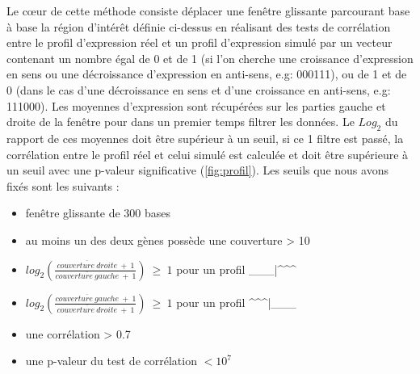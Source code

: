 \documentclass[12pt,a4paper]{report}
\begin{document}
\begin{onehalfspace}
Le cœur de cette méthode consiste déplacer une fenêtre glissante parcourant base à base la région d'intérêt définie ci-dessus en réalisant des tests de corrélation entre le profil d'expression réel et un profil d'expression simulé par un vecteur contenant un nombre égal de 0 et de 1 (si l'on cherche une croissance d'expression en sens ou une décroissance d'expression en anti-sens, e.g: 000111), ou de 1 et de 0 (dans le cas d'une décroissance en sens et d'une croissance en anti-sens, e.g: 111000). Les moyennes d'expression sont récupérées sur les parties gauche et droite de la fenêtre pour dans un premier temps filtrer les données. Le $Log_2$ du rapport de ces moyennes doit être supérieur à un seuil, si ce 1 filtre est passé, la corrélation entre le profil réel et celui simulé est calculée et doit être supérieure à un seuil avec une p-valeur significative (\autoref{fig:profil}). Les seuils que nous avons fixés sont les suivants : 
\begin{itemize}[label=$\bullet$]
\item fenêtre glissante de 300 bases
\item au moins un des deux gènes possède une couverture > 10
\item $log_2(\frac{\overline{couverture~droite}~+~1}{\overline{couverture~gauche}~+~1})~\geq~1$ pour un profil \_\_\_|\^{ }\^{ }\^{ }
\item $log_2(\frac{\overline{couverture~gauche}~+~1}{\overline{couverture~droite}~+~1})~\geq~1$ pour un profil \^{ }\^{ }\^{ }|\_\_\_
\item une corrélation > 0.7
\item une p-valeur du test de corrélation $< 10^7$
\end{itemize}


\end{onehalfspace}
\end{document}

